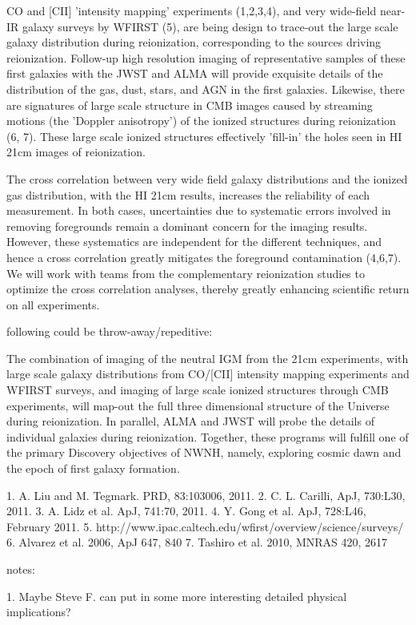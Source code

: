 \documentclass[preprint]{aastex}
\begin{document}
CO and [CII] 'intensity mapping' experiments (1,2,3,4), and very wide-field near-IR galaxy surveys by WFIRST (5), are being design to trace-out the large scale galaxy distribution during reionization, corresponding to the sources driving reionization. Follow-up high resolution imaging of representative samples of these first galaxies with the JWST and ALMA will provide exquisite details of the distribution of the gas, dust, stars, and AGN in the first galaxies. Likewise, there are signatures of large scale structure in CMB images caused by streaming motions (the 'Doppler anisotropy') of the ionized structures during reionization (6, 7). These large scale ionized structures effectively 'fill-in' the holes seen in HI 21cm images of reionization. 

The cross correlation between very wide field galaxy distributions and the ionized gas distribution, with the HI 21cm results, increases the reliability of each measurement. In both cases, uncertainties due to systematic errors involved in removing foregrounds remain a dominant concern for the imaging results. However, these systematics are independent for the different techniques, and hence a cross correlation greatly mitigates the foreground contamination (4,6,7). We will work with teams from the complementary reionization studies to optimize the cross correlation analyses, thereby greatly enhancing scientific return on all experiments. 

following could be throw-away/repeditive: 

The combination of imaging of the neutral IGM from the 21cm experiments, with large scale galaxy distributions from CO/[CII] intensity mapping experiments and WFIRST surveys, and imaging of large scale ionized structures through CMB experiments, will map-out the full three dimensional structure of the Universe during reionization. In parallel, ALMA and JWST will probe the details of individual galaxies during reionization. Together, these programs will fulfill one of the primary Discovery objectives of NWNH, namely, exploring cosmic dawn and the epoch of first galaxy formation.

1. A. Liu and M. Tegmark. PRD, 83:103006, 2011.
2. C. L. Carilli, ApJ, 730:L30, 2011.
3. A. Lidz et al. ApJ, 741:70, 2011.
4. Y. Gong et al. ApJ, 728:L46, February 2011.
5. http://www.ipac.caltech.edu/wfirst/overview/science/surveys/
6. Alvarez et al. 2006, ApJ 647, 840
7. Tashiro et al. 2010, MNRAS 420, 2617


notes:

1. Maybe Steve F. can put in some more interesting detailed physical implications?
\end{document}
